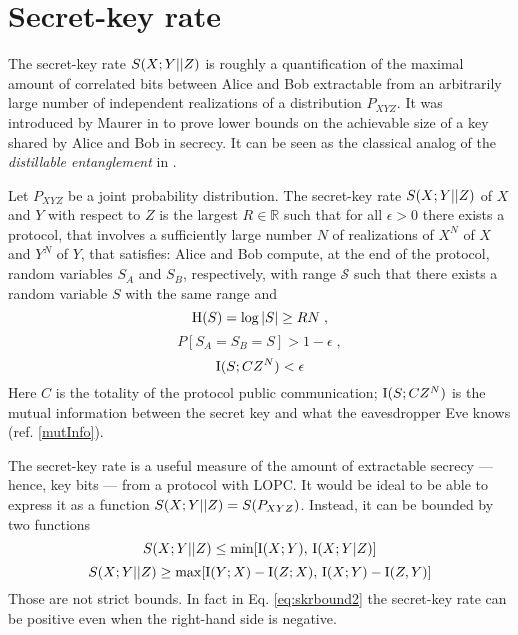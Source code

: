     
\section{Secret-key rate} \label{seckeyrate}
    The secret-key rate $S(X;Y||Z)$ is roughly a quantification of the maximal amount of correlated bits between Alice and Bob extractable from an arbitrarily large number of independent realizations of a distribution $P_{XYZ}$.
    It was introduced by Maurer in \cite{Maur93} to prove lower bounds on the achievable size of a key shared by Alice and Bob in secrecy.
    It can be seen as the classical analog of the \textit{distillable entanglement} in \cite{BDS96}.
    \begin{definition}\cite{Maur93, RW03}
    Let $P_{XYZ}$ be a joint probability distribution. The secret-key rate $S(X;Y||Z)$ of $X$ and $Y$ with respect to $Z$ is the largest $R\in \mathbb{R}$ such that for all $\epsilon > 0$ there exists a protocol, that involves a sufficiently large number $N$ of realizations of $X^N$ of $X$ and $Y^N$ of $Y$, that satisfies:
    Alice and Bob compute, at the end of the protocol, random variables $S_A$ and $S_B$, respectively, with range $\mathcal{S}$ such that there exists a random variable $S$ with the same range and
    \begin{equation*}
    	\operatorname{H}(S) = \log |S| \geq RN\; ,
    \end{equation*}
    \begin{equation*}
    	P[S_A=S_B=S]>1-\epsilon\; ,
    \end{equation*}
    \begin{equation*}
    	\operatorname{I}(S;CZ^N) < \epsilon
    \end{equation*}
	Here $C$ is the totality of the protocol public communication; $\operatorname{I}(S;CZ^N)$ is the mutual information between the secret key and what the eavesdropper Eve knows (ref. \ref{mutInfo}).
    \end{definition}
    
    The secret-key rate is a useful measure of the amount of extractable secrecy --- hence, key bits --- from a protocol with LOPC.
    It would be ideal to be able to express it as a function $S(X;Y||Z) = S(P_{XYZ})$.
    Instead, it can be bounded by two functions\cite{Maur93}
    \begin{equation}\label{eq:skrbound1}
    	S(X;Y||Z) \leq \min[\operatorname{I}(X;Y),\, \operatorname{I}(X;Y|Z)]
    \end{equation}
    \begin{equation}\label{eq:skrbound2}
    	S(X;Y||Z) \geq \max[\operatorname{I}(Y;X) - \operatorname{I}(Z;X),\, \operatorname{I}(X;Y) - \operatorname{I}(Z,Y)]
    \end{equation}
    Those are not strict bounds. In fact in Eq. \ref{eq:skrbound2} the secret-key rate can be positive even when the right-hand side is negative.
    
    
    
